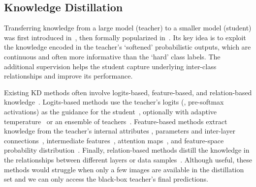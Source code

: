 \subsection{Knowledge Distillation}
\begin{foldable}
  Transferring knowledge from a large model (teacher) to a smaller model (student) was first introduced in~\cite{bucila2006model}, then formally popularized in~\cite{hinton2015distilling}.
  Its key idea is to exploit the knowledge encoded in the teacher's `softened' probabilistic outputs, which are continuous and often more informative than the `hard' class labels.
  The additional supervision helps the student capture underlying inter-class relationships and improve its performance.
\end{foldable}

\begin{foldable}
  Existing KD methods often involve logits-based, feature-based, and relation-based knowledge~\cite{gou2021knowledge}.
  Logits-based methods use the teacher's logits (\ie, pre-softmax activations) as the guidance for the student~\cite{ba2014deep,hinton2015distilling,nguyen2021knowledge}, optionally with adaptive temperature~\cite{li2023curriculum} or an ensemble of teachers~\cite{guo2020online}.
  Feature-based methods extract knowledge from the teacher's internal attributes \eg, parameters and inter-layer connections~\cite{liu2019knowledge}, intermediate features~\cite{romero2014fitnets}, attention maps~\cite{zagoruyko2016paying}, and feature-space probability distribution~\cite{passalis2018learning}.
  Finally, relation-based methods distill the knowledge in the relationships between different layers or data samples~\cite{park2019relational,yim2017gift,chen2020learning}.
  Although useful, these methods would struggle when only a few images are available in the distillation set and we can only access the black-box teacher's final predictions.
\end{foldable}

